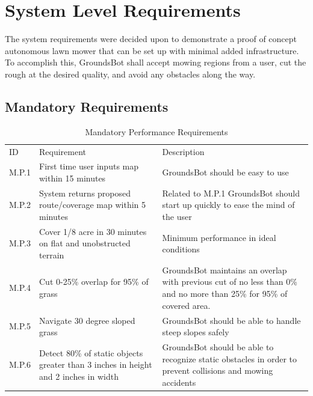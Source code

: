 \documentclass[12pt]{extarticle}
\begin{document}
\newpage
\section{System Level Requirements}

The system requirements were decided upon to demonstrate a proof of concept autonomous lawn mower that can be set up with minimal added infrastructure. To accomplish this, GroundsBot shall accept mowing regions from a user, cut the rough at the desired quality, and avoid any obstacles along the way.

\subsection{Mandatory Requirements}
\begin{center}
  \begin{table}[H]
  \caption{Mandatory Performance Requirements}
  \label{table:mandatory performance}

  \def\arraystretch{1.5}
  	\begin{tabularx}{\textwidth}{ lXX }
  	  \hline

		\sffamily\normalsize{ID} & \sffamily\normalsize{Requirement} & \sffamily\normalsize{Description} \\

    M.P.1 & First time user inputs map within 15 minutes & GroundsBot should be easy to use\\

    M.P.2 & System returns proposed route/coverage map within 5 minutes & Related to M.P.1 GroundsBot should start up quickly to ease the mind of the user\\

    M.P.3 & Cover 1/8 acre in 30 minutes on flat and unobstructed terrain & Minimum performance in ideal conditions\\

    M.P.4 & Cut 0-25\% overlap for 95\% of grass &  GroundsBot maintains an overlap with previous cut of no less than 0\% and no more than 25\% for 95\% of covered area.\\
    M.P.5 & Navigate 30 degree sloped grass & GroundsBot should be able to handle steep slopes safely\\

    M.P.6 & Detect 80\% of static objects greater than 3 inches in height and 2 inches in width & GroundsBot should be able to recognize static obstacles in order to prevent collisions and mowing accidents\\


\end{tabularx}
\end{table}
\end{center}
\end{document}
